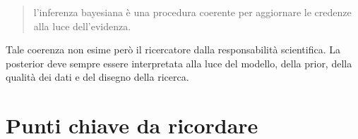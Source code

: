 \documentclass[
  italian,
  letterpaper,
  a4paper,
  11pt,
  open=any]{scrbook}
\theoremstyle{plain}
\theoremstyle{definition}
\theoremstyle{definition}
\theoremstyle{remark}
\begin{document}
\begin{quote}
l'inferenza bayesiana è una procedura coerente per aggiornare le
credenze alla luce dell'evidenza.
\end{quote}

Tale coerenza non esime però il ricercatore dalla responsabilità
scientifica. La posterior deve sempre essere interpretata alla luce del
modello, della prior, della qualità dei dati e del disegno della
ricerca.

\section*{Punti chiave da ricordare}\label{punti-chiave-da-ricordare-14}

\end{document}
